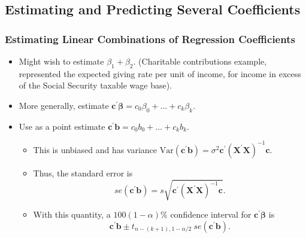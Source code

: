 \subsection{Estimating and Predicting Several Coefficients}

\begin{frame}%
 \frametitle{Estimating Linear Combinations of Regression Coefficients}
   \begin{itemize}
 \item Might wish to estimate $\beta_1 + \beta_2$. (Charitable
 contributions example, represented the expected giving rate per
 unit of income, for income in excess of the Social Security taxable wage base).
 \item More generally, estimate $\mathbf{c}^{\prime} \boldsymbol \beta
= c_0 \beta_0 + \ldots + c_k \beta_k.$
\item Use as a point estimate $\mathbf{c}^{\prime} \mathbf{b}
= c_0 b_0 + \ldots + c_k b_k.$

  \begin{itemize}
 \item This is unbiased and has variance  $\mathrm{Var}\left( \mathbf{c}^{\prime
}\mathbf{b}\right) =\sigma ^{2} \mathbf{c}^{\prime
}(\mathbf{X^{\prime} X})^{-1}\mathbf{c}$.
 \item Thus, the standard error is
 \begin{equation*}
se\left( \mathbf{c}^{\prime }\mathbf{b}\right)
=s\sqrt{\mathbf{c}^{\prime }(\mathbf{X^{\prime }X})^{-1}\mathbf{c}}.
\end{equation*}
\item With this quantity, a $100(1-\alpha ) \%$ confidence interval
for $\mathbf{c}^{\prime } \boldsymbol \beta$ is
\begin{equation*}
\mathbf{c}^{\prime }\mathbf{b}\pm t_{n-(k+1),1-\alpha /2}
~se(\mathbf{c}^{\prime }\mathbf{b}).
\end{equation*}
  \end{itemize}
    \end{itemize}
\end{frame}




